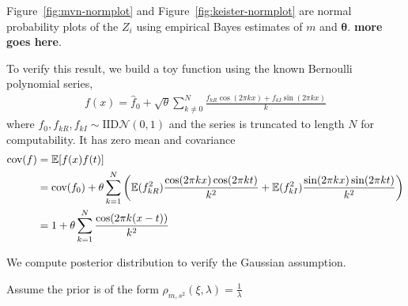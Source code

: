 \documentclass{iitthesis}          %
\newcommand{\bm}[1]{\boldsymbol{#1}}
\newcommand{\Ex}{\mathbb{E}}
\newcommand{\vtheta}{{\bm{\theta}}}
\newcommand{\cov}{{\textup{cov}}}
\newcommand{\calN}{\mathcal{N}}
\newcommand\figref{Figure~\ref}
\begin{document}
{{{{{{\figref{fig:mvn-normplot} and \figref{fig:keister-normplot} are normal probability plots of the $Z_i$ using empirical Bayes estimates of $m$ and $\vtheta$. \textbf{more goes here}.

To verify this result, we build a toy function using the known Bernoulli polynomial series,
\begin{align*}
f(x) = \hat{f}_0 + \sqrt{\theta} \sum_{k \neq 0}^N 
\frac{f_{kR} \cos(2\pi k x) + f_{kI} \sin(2\pi k x)}{k}
\end{align*}
where $f_0, f_{kR}, f_{kI} \sim \text{IID} \calN(0, 1) $ and the series is truncated to length $N$ for computability. It has zero mean and covariance
\begin{align*}
\cov(f) &= \Ex[f(x) f(t)] \\
&= \cov(f_0) + \theta \sum_{k=1}^N 
\left(	
\Ex(f_{kR}^2) \frac{\cos(2\pi k x) \cos(2\pi k t)}{k^2} +
\Ex(f_{kI}^2) \frac{\sin(2\pi k x) \sin(2\pi k t)}{k^2} \right) \\
&= 1 + \theta \sum_{k=1}^N 	
 \frac{\cos(2\pi k (x - t)) }{k^2} 
\end{align*}




 We compute posterior distribution to verify the Gaussian assumption.

Assume the prior is of the form $ \rho_{m,s^2} (\xi, \lambda) = \frac{1}{\lambda} $ 

}}}}}}
\end{document}
